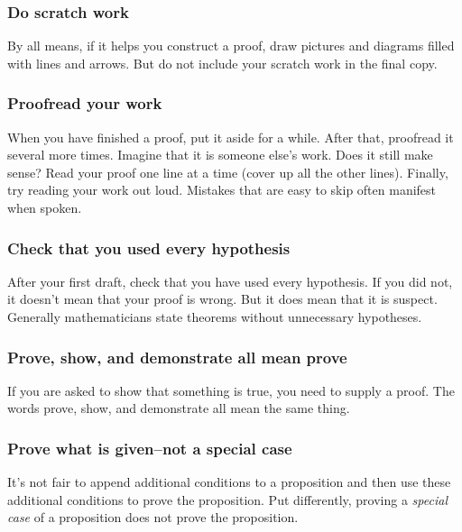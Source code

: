 \documentclass[12pt]{article}
\newcounter{id}\setcounter{id}{0}
\newcounter{se}\setcounter{se}{0}
\begin{document}


 \subsubsection{ Do scratch work}

By all means, if it helps you construct a proof, draw pictures and
diagrams filled with lines and arrows.  But do not include your scratch
work in the final copy.

 \subsubsection{ Proofread your work}

When you have finished a proof, put it aside for a while.  After that,
proofread it several more times. Imagine that it is someone else's
work.  Does it still make sense?  Read your proof one line at a time
(cover up all the other lines). Finally, try reading your work out
loud. Mistakes that are easy to skip often manifest when spoken.


 \subsubsection{Check that you used every hypothesis}

After your first draft, check that you have used every hypothesis.
If you did not, it doesn't mean that your proof is wrong.  But it
does mean that it is  suspect.  Generally mathematicians
state theorems without unnecessary hypotheses.

 \subsubsection{ Prove, show, and demonstrate all mean prove}

If you are asked to show that something is true, you need to
supply a proof.  The words prove, show, and demonstrate all mean the
same thing. 

 \subsubsection{ Prove what is given--not a special case}

It's not fair to append additional conditions to a proposition and 
then use these additional conditions to prove the proposition.  Put
differently, proving a {\em special case\/} of a proposition does not
prove the proposition. 
\end{document}
